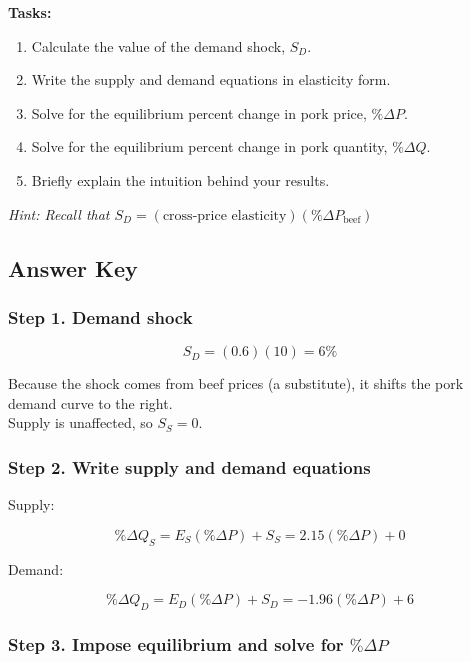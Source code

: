 \documentclass[
  letterpaper,
  DIV=11,
  numbers=noendperiod]{scrartcl}
\providecommand{\tightlist}{%
  \setlength{\itemsep}{0pt}\setlength{\parskip}{0pt}}
\begin{document}
\textbf{Tasks:}

\begin{enumerate}
\def\labelenumi{\arabic{enumi}.}
\tightlist
\item
  Calculate the value of the demand shock, \(S_D\).\\
\item
  Write the supply and demand equations in elasticity form.\\
\item
  Solve for the equilibrium percent change in pork price,
  \(\% \Delta P\).\\
\item
  Solve for the equilibrium percent change in pork quantity,
  \(\% \Delta Q\).\\
\item
  Briefly explain the intuition behind your results.
\end{enumerate}

\emph{Hint: Recall that
\(S_D = (\text{cross-price elasticity})(\% \Delta P_{\text{beef}})\)}

\subsection{Answer Key}\label{answer-key}

\subsubsection{Step 1. Demand shock}\label{step-1.-demand-shock}

\[
S_D = (0.6)(10) = 6 \%
\]

Because the shock comes from beef prices (a substitute), it shifts the
pork demand curve to the right.\\
Supply is unaffected, so \(S_S = 0\).

\subsubsection{Step 2. Write supply and demand
equations}\label{step-2.-write-supply-and-demand-equations}

Supply:

\[
\% \Delta Q_S = E_S (\% \Delta P) + S_S = 2.15 (\% \Delta P) + 0
\]

Demand:

\[
\% \Delta Q_D = E_D (\% \Delta P) + S_D = -1.96 (\% \Delta P) + 6
\]

\subsubsection{\texorpdfstring{Step 3. Impose equilibrium and solve for
\(\% \Delta P\)}{Step 3. Impose equilibrium and solve for \textbackslash\% \textbackslash Delta P}}\label{step-3.-impose-equilibrium-and-solve-for-delta-p}
\end{document}
